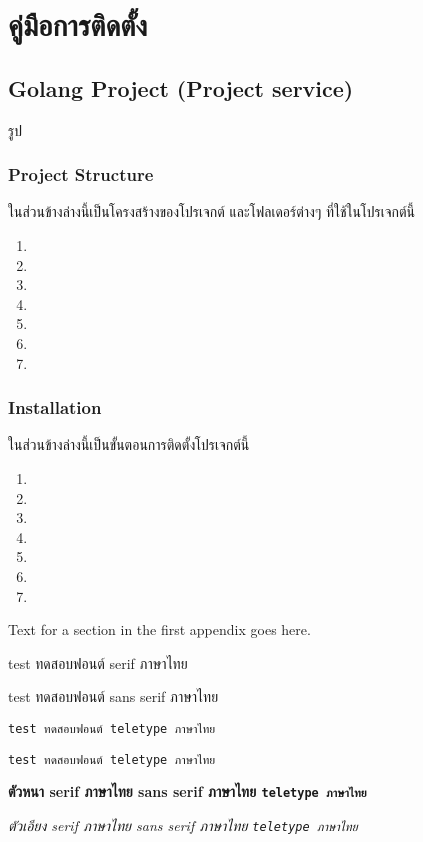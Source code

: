 \chapter{คู่มือการติดตั้ง}

\section{Golang Project (Project service)}
  \qquad รูป
  \subsection{Project Structure}
    \qquad ในส่วนข้างล่างนี้เป็นโครงสร้างของโปรเจกต์ และโฟลเดอร์ต่างๆ ที่ใช้ในโปรเจกต์นี้
    \begin{enumerate}
      \item 
      \item 
      \item 
      \item
      \item
      \item
      \item
    \end{enumerate}
  \subsection{Installation}
    \qquad ในส่วนข้างล่างนี้เป็นขั้นตอนการติดตั้งโปรเจกต์นี้
    \begin{enumerate}
      \item 
      \item 
      \item 
      \item
      \item
      \item
      \item
    \end{enumerate}
  

Text for a section in the first appendix goes here.

test ทดสอบฟอนต์ serif ภาษาไทย

\textsf{test ทดสอบฟอนต์ sans serif ภาษาไทย}

\verb+test ทดสอบฟอนต์ teletype ภาษาไทย+

\texttt{test ทดสอบฟอนต์ teletype ภาษาไทย}

\textbf{ตัวหนา serif ภาษาไทย \textsf{sans serif ภาษาไทย} \texttt{teletype ภาษาไทย}}

\textit{ตัวเอียง serif ภาษาไทย \textsf{sans serif ภาษาไทย} \texttt{teletype ภาษาไทย}}

